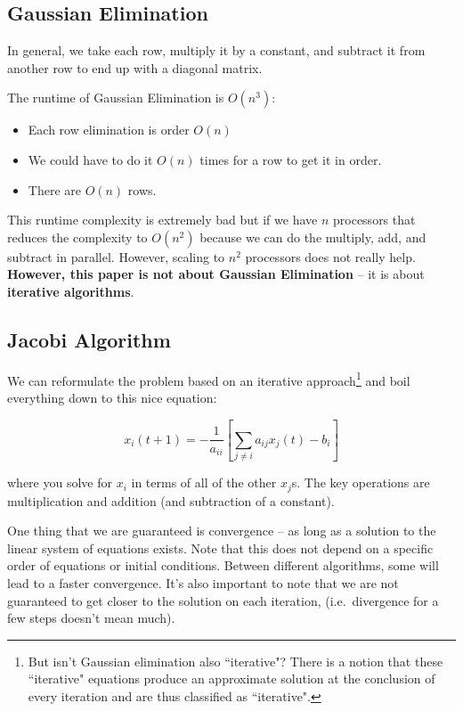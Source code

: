 \subsection{Gaussian Elimination}

In general, we take each row, multiply it by a constant, and subtract it from another row to end up with a diagonal matrix. 

The runtime of Gaussian Elimination is \( O (n^3) \):
\begin{itemize}
    \item Each row elimination is order \( O(n) \)
    \item We could have to do it \( O(n) \) times for a row to get it in order.
    \item There are \( O(n) \) rows.
\end{itemize}

This runtime complexity is extremely bad but if we have \( n \) processors that reduces the complexity to \( O(n^2) \) because we can do the multiply, add, and subtract in parallel. However, scaling to \( n^2 \) processors does not really help. \textbf{However, this paper is not about Gaussian Elimination} -- it is about \textbf{iterative algorithms}. 

\subsection{Jacobi Algorithm}

We can reformulate the problem based on an iterative approach\footnote{But isn't Gaussian elimination also ``iterative"? There is a notion that these ``iterative" equations produce an approximate solution at the conclusion of every iteration and are thus classified as ``iterative".} and boil everything down to this nice equation:

\[
x_{i}(t + 1) = -\frac{1}{a_{ii}} [ \sum_{j \neq i} a_{ij} x_{j} (t) - b_{i} ]
\]

where you solve for \( x_{i} \) in terms of all of the other \( x_{j} \)s. The key operations are  multiplication and addition (and subtraction of a constant).

One thing that we are guaranteed is convergence -- as long as a solution to the linear system of equations exists. Note that this does not depend on a specific order of equations or initial conditions. Between different algorithms, some will lead to a faster convergence. It's also important to note that we are not guaranteed to get closer to the solution on each iteration, (i.e.\ divergence for a few steps doesn't mean much).

